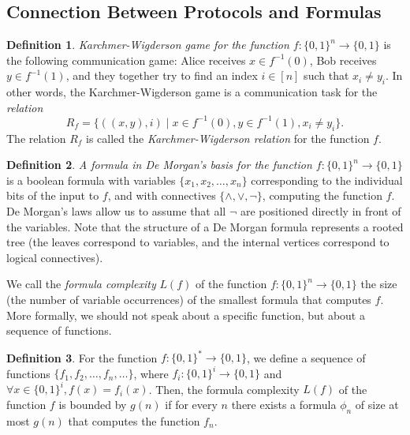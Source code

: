 \documentclass[12pt,sans]{article}
\newcommand{\bits}{\{0,1\}}
\newcommand{\bitstr}{\bits^*}
\newcommand{\seqn}[2]{{#1}_1,{#1}_2,\dotsc,{#1}_{#2}}
\theoremstyle{definition}
\newtheorem{definition}{Definition}[section]
\theoremstyle{plain}
\theoremstyle{remark}
\begin{document}
\subsection{Connection Between Protocols and Formulas}
\begin{definition}
    \emph{Karchmer-Wigderson game for the function $f : \{0,1\}^n \to \{0,1\}$} is the following communication game: Alice receives $x \in f^{-1}(0)$, Bob receives $y \in f^{-1}(1)$, and they together try to find an index $i \in [n]$ such that $x_i \neq y_i$. In other words, the Karchmer-Wigderson game is a communication task for the \emph{relation}
    $$R_f = \{((x,y),i) \mid x \in f^{-1}(0), y \in f^{-1}(1), x_i \neq y_i\}.$$
    The relation $R_f$ is called the \emph{Karchmer-Wigderson relation} for the function $f$.
\end{definition}

\begin{definition}
    \emph{A formula in De Morgan's basis for the function $f:\{0,1\}^n \to \{0,1\}$} is a boolean formula with variables $\{\seqn{x}{n}\}$ corresponding to the individual bits of the input to $f$, and with connectives $\{\land, \lor, \neg\}$, computing the function $f$. De Morgan's laws allow us to assume that all $\neg$ are positioned directly in front of the variables. Note that the structure of a De Morgan formula represents a rooted tree (the leaves correspond to variables, and the internal vertices correspond to logical connectives).
\end{definition}

We call the \emph{formula complexity} $L(f)$ of the function $f : \{0,1\}^n \to \{0,1\}$ the size (the number of variable occurrences) of the smallest formula that computes $f$. More formally, we should not speak about a specific function, but about a sequence of functions.

\begin{definition}
    For the function $f:\bitstr\to\{0,1\}$, we define a sequence of functions $\{\seqn{f}{n},\dotsc\}$, where $f_i: \{0,1\}^i\to\{0,1\}$ and $\forall x\in\{0,1\}^i, f(x) = f_i(x)$. Then, the formula complexity $L(f)$ of the function $f$ is bounded by $g(n)$ if for every $n$ there exists a formula $\phi_n$ of size at most $g(n)$ that computes the function $f_n$.
\end{definition}
\end{document}
